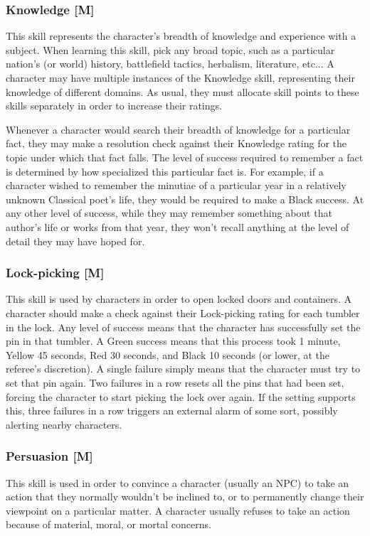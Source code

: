 \documentclass[oneside]{book}
\begin{document}
\begin{multicols}{2}
\subsubsection{Knowledge [M]}
This skill represents the character's breadth of knowledge and experience with a subject. When learning this skill, pick any broad topic, such as a particular nation's (or world) history, battlefield tactics, herbalism, literature, etc... A character may have multiple instances of the Knowledge skill, representing their knowledge of different domains. As usual, they must allocate skill points to these skills separately in order to increase their ratings.

Whenever a character would search their breadth of knowledge for a particular fact, they may make a resolution check against their Knowledge rating for the topic under which that fact falls. The level of success required to remember a fact is determined by how specialized this particular fact is. For example, if a character wished to remember the minutiae of a particular year in a relatively unknown Classical poet's life, they would be required to make a Black success. At any other level of success, while they may remember something about that author's life or works from that year, they won't recall anything at the level of detail they may have hoped for.

\subsubsection{Lock-picking [M]}
This skill is used by characters in order to open locked doors and containers. A character should make a check against their Lock-picking rating for each tumbler in the lock. Any level of success means that the character has successfully set the pin in that tumbler. A Green success means that this process took 1 minute, Yellow 45 seconds, Red 30 seconds, and Black 10 seconds (or lower, at the referee's discretion). A single failure simply means that the character must try to set that pin again. Two failures in a row resets all the pins that had been set, forcing the character to start picking the lock over again. If the setting supports this, three failures in a row triggers an external alarm of some sort, possibly alerting nearby characters.
\subsubsection{Persuasion [M]}
This skill is used in order to convince a character (usually an NPC) to take an action that they normally wouldn't be inclined to, or to permanently change their viewpoint on a particular matter. A character usually refuses to take an action because of material, moral, or mortal concerns. 


\end{multicols}
\end{document}
